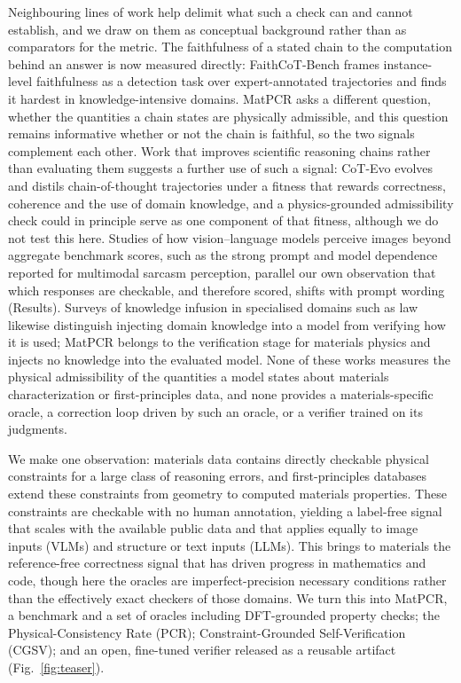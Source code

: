 \documentclass[pdflatex,sn-nature]{sn-jnl}
\newcommand{\rev}[1]{#1} %
\newcommand{\rev}[1]{{\color{blue}#1}} %
\providecommand{\DIFadd}[1]{{\protect\color{blue} \sf #1}} %
\providecommand{\DIFaddbegin}{} %
\providecommand{\DIFaddend}{} %
\providecommand{\DIFaddincludegraphics}[2][]{{\color{blue}\fbox{\DIFOincludegraphics[#1]{#2}}}} %
\DeclareRobustCommand{\DIFaddbegin}{\DIFOaddbegin \let\includegraphics\DIFaddincludegraphics} %
\DeclareRobustCommand{\DIFaddend}{\DIFOaddend \let\includegraphics\DIFOincludegraphics} %
\begin{document}
\DIFaddbegin \DIFadd{\rev{Neighbouring lines of work help delimit what such a check can and cannot establish, and we
draw on them as conceptual background rather than as comparators for the metric. The faithfulness of
a stated chain to the computation behind an answer is now measured directly: FaithCoT-Bench frames
instance-level faithfulness as a detection task over expert-annotated trajectories and finds it
hardest in knowledge-intensive domains.\cite{faithcotbench2026} MatPCR asks a different question,
whether the quantities a chain states are physically admissible, and this question remains
informative whether or not the chain is faithful, so the two signals complement each other. Work that
improves scientific reasoning chains rather than evaluating them suggests a further use of such a
signal: CoT-Evo evolves and distils chain-of-thought trajectories under a fitness that rewards
correctness, coherence and the use of domain knowledge,\cite{cotevo2026} and a physics-grounded
admissibility check could in principle serve as one component of that fitness, although we do not
test this here. Studies of how vision--language models perceive images beyond aggregate benchmark
scores, such as the strong prompt and model dependence reported for multimodal sarcasm
perception,\cite{sarcasm2026lvlm} parallel our own observation that which responses are checkable,
and therefore scored, shifts with prompt wording (Results). Surveys of knowledge infusion in
specialised domains such as law\cite{legalinfusion2026} likewise distinguish injecting domain
knowledge into a model from verifying how it is used; MatPCR belongs to the verification stage for
materials physics and injects no knowledge into the evaluated model. None of these works measures the
physical admissibility of the quantities a model states about materials characterization or
first-principles data, and none provides a materials-specific oracle, a correction loop driven by
such an oracle, or a verifier trained on its judgments.}
}

\DIFaddend We make one observation: materials data contains directly checkable physical
constraints for a large class of reasoning errors, and first-principles databases
extend these constraints from geometry to computed materials properties. These constraints are
checkable with no human annotation, yielding a label-free signal that scales with the
available public data and that applies equally to image inputs (VLMs) and
structure or text inputs (LLMs). This brings to materials the reference-free correctness
signal that has driven progress in mathematics and code, though here the oracles are
imperfect-precision necessary conditions rather than the effectively exact checkers of
those domains. We turn this into MatPCR, a benchmark and a set of
oracles including DFT-grounded property checks; the Physical-Consistency Rate (PCR);
Constraint-Grounded Self-Verification (CGSV); and an open, fine-tuned verifier
released as a reusable artifact (Fig.~\ref{fig:teaser}).
\end{document}
